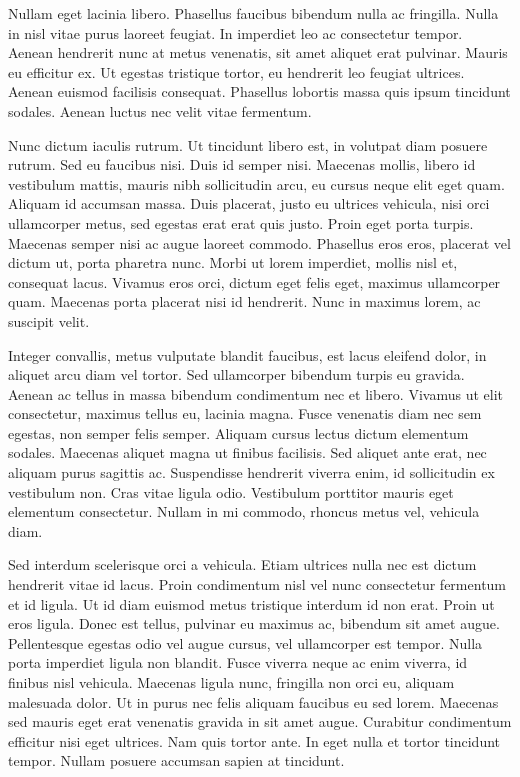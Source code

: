 \documentclass[book,A4paper,10pt,twoside,oldfontcommands]{memoir}\usepackage[]{graphicx}\usepackage[usenames,dvipsnames]{color}
\begin{document}
\begin{btUnit}
Nullam eget lacinia libero. Phasellus faucibus bibendum nulla ac
fringilla. Nulla in nisl vitae purus laoreet feugiat. In imperdiet leo
ac consectetur tempor. Aenean hendrerit nunc at metus venenatis, sit
amet aliquet erat pulvinar. Mauris eu efficitur ex. Ut egestas
tristique tortor, eu hendrerit leo feugiat ultrices. Aenean euismod
facilisis consequat. Phasellus lobortis massa quis ipsum tincidunt
sodales. Aenean luctus nec velit vitae fermentum.

Nunc dictum iaculis rutrum. Ut tincidunt libero est, in volutpat diam
posuere rutrum. Sed eu faucibus nisi. Duis id semper nisi. Maecenas
mollis, libero id vestibulum mattis, mauris nibh sollicitudin arcu, eu
cursus neque elit eget quam. Aliquam id accumsan massa. Duis placerat,
justo eu ultrices vehicula, nisi orci ullamcorper metus, sed egestas
erat erat quis justo. Proin eget porta turpis. Maecenas semper nisi ac
augue laoreet commodo. Phasellus eros eros, placerat vel dictum ut,
porta pharetra nunc. Morbi ut lorem imperdiet, mollis nisl et,
consequat lacus. Vivamus eros orci, dictum eget felis eget, maximus
ullamcorper quam. Maecenas porta placerat nisi id hendrerit. Nunc in
maximus lorem, ac suscipit velit.

Integer convallis, metus vulputate blandit faucibus, est lacus
eleifend dolor, in aliquet arcu diam vel tortor. Sed ullamcorper
bibendum turpis eu gravida. Aenean ac tellus in massa bibendum
condimentum nec et libero. Vivamus ut elit consectetur, maximus tellus
eu, lacinia magna. Fusce venenatis diam nec sem egestas, non semper
felis semper. Aliquam cursus lectus dictum elementum sodales. Maecenas
aliquet magna ut finibus facilisis. Sed aliquet ante erat, nec aliquam
purus sagittis ac. Suspendisse hendrerit viverra enim, id sollicitudin
ex vestibulum non. Cras vitae ligula odio. Vestibulum porttitor mauris
eget elementum consectetur. Nullam in mi commodo, rhoncus metus vel,
vehicula diam.

Sed interdum scelerisque orci a vehicula. Etiam ultrices nulla nec est
dictum hendrerit vitae id lacus. Proin condimentum nisl vel nunc
consectetur fermentum et id ligula. Ut id diam euismod metus tristique
interdum id non erat. Proin ut eros ligula. Donec est tellus, pulvinar
eu maximus ac, bibendum sit amet augue. Pellentesque egestas odio vel
augue cursus, vel ullamcorper est tempor. Nulla porta imperdiet ligula
non blandit. Fusce viverra neque ac enim viverra, id finibus nisl
vehicula. Maecenas ligula nunc, fringilla non orci eu, aliquam
malesuada dolor. Ut in purus nec felis aliquam faucibus eu sed lorem.
Maecenas sed mauris eget erat venenatis gravida in sit amet augue.
Curabitur condimentum efficitur nisi eget ultrices. Nam quis tortor
ante. In eget nulla et tortor tincidunt tempor. Nullam posuere
accumsan sapien at tincidunt.


\end{btUnit}
\end{document}
